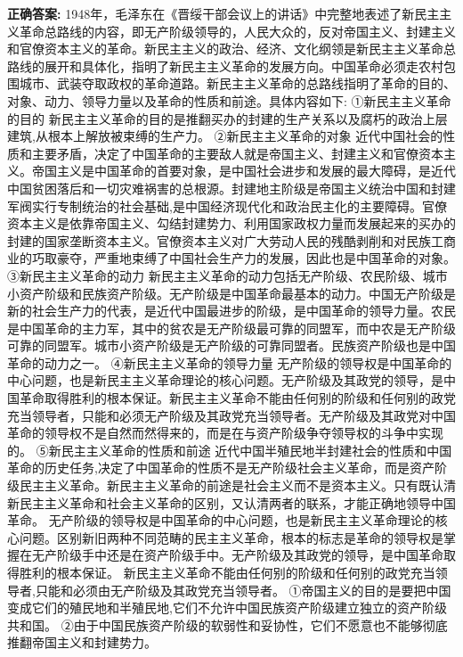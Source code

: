 \documentclass[12pt,UTF8]{ctexart}
\begin{document}
\textbf{正确答案:}
1948年，毛泽东在《晋绥干部会议上的讲话》中完整地表述了新民主主义革命总路线的内容，即无产阶级领导的，人民大众的，反对帝国主义、封建主义和官僚资本主义的革命。新民主主义的政治、经济、文化纲领是新民主主义革命总路线的展开和具体化，指明了新民主主义革命的发展方向。中国革命必须走农村包围城市、武装夺取政权的革命道路。新民主主义革命的总路线指明了革命的目的、对象、动力、领导力量以及革命的性质和前途。具体内容如下:
①新民主主义革命的目的
新民主主义革命的目的是推翻买办的封建的生产关系以及腐朽的政治上层建筑,从根本上解放被束缚的生产力。
②新民主主义革命的对象
近代中国社会的性质和主要矛盾，决定了中国革命的主要敌人就是帝国主义、封建主义和官僚资本主义。帝国主义是中国革命的首要对象，是中国社会进步和发展的最大障碍，是近代中国贫困落后和一切灾难祸害的总根源。封建地主阶级是帝国主义统治中国和封建军阀实行专制统治的社会基础,是中国经济现代化和政治民主化的主要障碍。官僚资本主义是依靠帝国主义、勾结封建势力、利用国家政权力量而发展起来的买办的封建的国家垄断资本主义。官僚资本主义对广大劳动人民的残酷剥削和对民族工商业的巧取豪夺，严重地束缚了中国社会生产力的发展，因此也是中国革命的对象。
③新民主主义革命的动力
新民主主义革命的动力包括无产阶级、农民阶级、城市小资产阶级和民族资产阶级。无产阶级是中国革命最基本的动力。中国无产阶级是新的社会生产力的代表，是近代中国最进步的阶级，是中国革命的领导力量。农民是中国革命的主力军，其中的贫农是无产阶级最可靠的同盟军，而中农是无产阶级可靠的同盟军。城市小资产阶级是无产阶级的可靠同盟者。民族资产阶级也是中国革命的动力之一。
④新民主主义革命的领导力量
无产阶级的领导权是中国革命的中心问题，也是新民主主义革命理论的核心问题。无产阶级及其政党的领导，是中国革命取得胜利的根本保证。新民主主义革命不能由任何别的阶级和任何别的政党充当领导者，只能和必须无产阶级及其政党充当领导者。无产阶级及其政党对中国革命的领导权不是自然而然得来的，而是在与资产阶级争夺领导权的斗争中实现的。
⑤新民主主义革命的性质和前途
近代中国半殖民地半封建社会的性质和中国革命的历史任务,决定了中国革命的性质不是无产阶级社会主义革命，而是资产阶级民主主义革命。新民主主义革命的前途是社会主义而不是资本主义。只有既认清新民主主义革命和社会主义革命的区别，又认清两者的联系，才能正确地领导中国革命。
无产阶级的领导权是中国革命的中心问题，也是新民主主义革命理论的核心问题。区别新旧两种不同范畴的民主主义革命，根本的标志是革命的领导权是掌握在无产阶级手中还是在资产阶级手中。无产阶级及其政党的领导，是中国革命取得胜利的根本保证。
新民主主义革命不能由任何别的阶级和任何别的政党充当领导者,只能和必须由无产阶级及其政党充当领导者。
①帝国主义的目的是要把中国变成它们的殖民地和半殖民地,它们不允许中国民族资产阶级建立独立的资产阶级共和国。
②由于中国民族资产阶级的软弱性和妥协性，它们不愿意也不能够彻底推翻帝国主义和封建势力。
\end{document}
